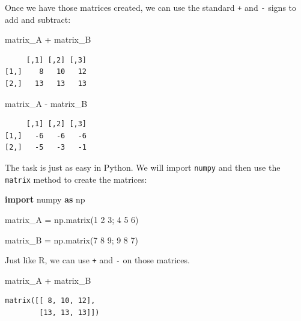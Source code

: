 \documentclass[
  letterpaper,
]{krantz}
\newenvironment{Shaded}{}{}
\newcommand{\ImportTok}[1]{\textcolor[rgb]{0.00,0.50,0.00}{\textbf{#1}}}
\newcommand{\NormalTok}[1]{#1}
\newcommand{\OperatorTok}[1]{\textcolor[rgb]{0.40,0.40,0.40}{#1}}
\newcommand{\SpecialCharTok}[1]{\textcolor[rgb]{0.25,0.44,0.63}{#1}}
\newcommand{\StringTok}[1]{\textcolor[rgb]{0.25,0.44,0.63}{#1}}
\begin{document}
Once we have those matrices created, we can use the standard \texttt{+}
and \texttt{-} signs to add and subtract:

\begin{Shaded}
\begin{Highlighting}[]
\NormalTok{matrix\_A }\SpecialCharTok{+}\NormalTok{ matrix\_B}
\end{Highlighting}
\end{Shaded}

\begin{verbatim}
     [,1] [,2] [,3]
[1,]    8   10   12
[2,]   13   13   13
\end{verbatim}

\begin{Shaded}
\begin{Highlighting}[]
\NormalTok{matrix\_A }\SpecialCharTok{{-}}\NormalTok{ matrix\_B}
\end{Highlighting}
\end{Shaded}

\begin{verbatim}
     [,1] [,2] [,3]
[1,]   -6   -6   -6
[2,]   -5   -3   -1
\end{verbatim}

The task is just as easy in Python. We will import \texttt{numpy} and
then use the \texttt{matrix} method to create the matrices:

\begin{Shaded}
\begin{Highlighting}[]
\ImportTok{import}\NormalTok{ numpy }\ImportTok{as}\NormalTok{ np}

\NormalTok{matrix\_A }\OperatorTok{=}\NormalTok{ np.matrix(}\StringTok{\textquotesingle{}1 2 3; 4 5 6\textquotesingle{}}\NormalTok{)}

\NormalTok{matrix\_B }\OperatorTok{=}\NormalTok{ np.matrix(}\StringTok{\textquotesingle{}7 8 9; 9 8 7\textquotesingle{}}\NormalTok{)}
\end{Highlighting}
\end{Shaded}

Just like R, we can use \texttt{+} and \texttt{-} on those matrices.

\begin{Shaded}
\begin{Highlighting}[]
\NormalTok{matrix\_A }\OperatorTok{+}\NormalTok{ matrix\_B}
\end{Highlighting}
\end{Shaded}

\begin{verbatim}
matrix([[ 8, 10, 12],
        [13, 13, 13]])
\end{verbatim}
\end{document}
